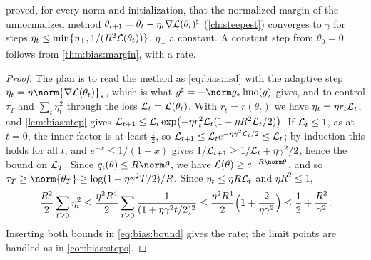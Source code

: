 \begin{refsection}
\Textcite{GunasekarEtAl2018} proved, for every norm and initialization, that the normalized margin of the unnormalized method $\theta_{t+1}=\theta_t-\eta_t\nabla\mathcal{L}(\theta_t)^\sharp$ (\cref{ch:steepest}) converges to $\gamma$ for steps $\eta_t\le\min\{\eta_+,1/(R^2\mathcal{L}(\theta_t))\}$, $\eta_+$ a constant. A constant step from $\theta_0=0$ follows from \cref{thm:bias:margin}, with a rate.


\begin{proof}
The plan is to read the method as \eqref{eq:bias:nsd} with the adaptive step $\eta_t=\eta\norm{\nabla\Loss(\theta_t)}_*$, which is what $g^\sharp=-\norm g_*\lmo(g)$ gives, and to control $\tau_T$ and $\sum_t\eta_t^2$ through the loss $\mathcal{L}_t=\mathcal{L}(\theta_t)$. With $r_t=r(\theta_t)$ we have $\eta_t=\eta r_t\mathcal{L}_t$, and \cref{lem:bias:step} gives $\mathcal{L}_{t+1}\le\mathcal{L}_t\exp\bigl(-\eta r_t^2\mathcal{L}_t(1-\eta R^2\mathcal{L}_t/2)\bigr)$. If $\mathcal{L}_t\le1$, as at $t=0$, the inner factor is at least $\frac12$, so $\mathcal{L}_{t+1}\le\mathcal{L}_te^{-\eta\gamma^2\mathcal{L}_t/2}\le\mathcal{L}_t$; by induction this holds for all $t$, and $e^{-x}\le1/(1+x)$ gives $1/\mathcal{L}_{t+1}\ge1/\mathcal{L}_t+\eta\gamma^2/2$, hence the bound on $\mathcal{L}_T$. Since $q_i(\theta)\le R\norm\theta$, we have $\Loss(\theta)\ge e^{-R\norm\theta}$, and so $\tau_T\ge\norm{\theta_T}\ge\log(1+\eta\gamma^2T/2)/R$. Since $\eta_t\le\eta R\mathcal{L}_t$ and $\eta R^2\le1$,
\[
  \frac{R^2}2\sum_{t\ge0}\eta_t^2\le\frac{\eta^2R^4}2\sum_{t\ge0}\frac1{(1+\eta\gamma^2t/2)^2}\le\frac{\eta^2R^4}2\Bigl(1+\frac2{\eta\gamma^2}\Bigr)\le\frac12+\frac{R^2}{\gamma^2}.
\]
Inserting both bounds in \eqref{eq:bias:bound} gives the rate; the limit points are handled as in \cref{cor:bias:steps}.
\end{proof}


\end{refsection}
